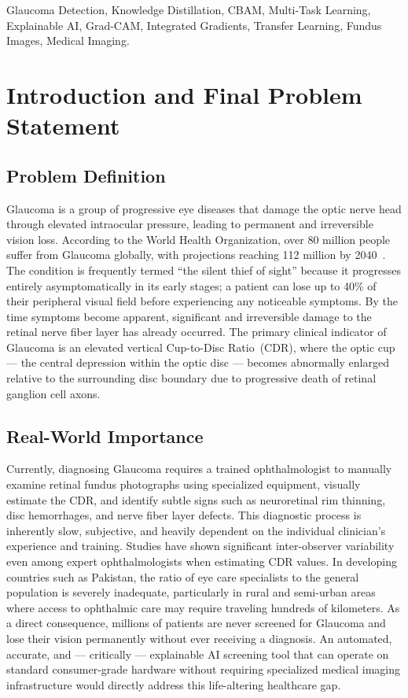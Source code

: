 \documentclass[conference]{IEEEtran}
\begin{document}
\begin{IEEEkeywords}
Glaucoma Detection, Knowledge Distillation, CBAM, Multi-Task Learning, Explainable AI, Grad-CAM, Integrated Gradients, Transfer Learning, Fundus Images, Medical Imaging.
\end{IEEEkeywords}

\section{Introduction and Final Problem Statement}

\subsection{Problem Definition}
Glaucoma is a group of progressive eye diseases that damage the optic nerve head through elevated intraocular pressure, leading to permanent and irreversible vision loss. According to the World Health Organization, over 80 million people suffer from Glaucoma globally, with projections reaching 112 million by 2040~\cite{who2019}. The condition is frequently termed ``the silent thief of sight'' because it progresses entirely asymptomatically in its early stages; a patient can lose up to 40\% of their peripheral visual field before experiencing any noticeable symptoms. By the time symptoms become apparent, significant and irreversible damage to the retinal nerve fiber layer has already occurred. The primary clinical indicator of Glaucoma is an elevated vertical Cup-to-Disc Ratio~(CDR), where the optic cup --- the central depression within the optic disc --- becomes abnormally enlarged relative to the surrounding disc boundary due to progressive death of retinal ganglion cell axons.

\subsection{Real-World Importance}
Currently, diagnosing Glaucoma requires a trained ophthalmologist to manually examine retinal fundus photographs using specialized equipment, visually estimate the CDR, and identify subtle signs such as neuroretinal rim thinning, disc hemorrhages, and nerve fiber layer defects. This diagnostic process is inherently slow, subjective, and heavily dependent on the individual clinician's experience and training. Studies have shown significant inter-observer variability even among expert ophthalmologists when estimating CDR values. In developing countries such as Pakistan, the ratio of eye care specialists to the general population is severely inadequate, particularly in rural and semi-urban areas where access to ophthalmic care may require traveling hundreds of kilometers. As a direct consequence, millions of patients are never screened for Glaucoma and lose their vision permanently without ever receiving a diagnosis. An automated, accurate, and --- critically --- explainable AI screening tool that can operate on standard consumer-grade hardware without requiring specialized medical imaging infrastructure would directly address this life-altering healthcare gap.
\end{document}
